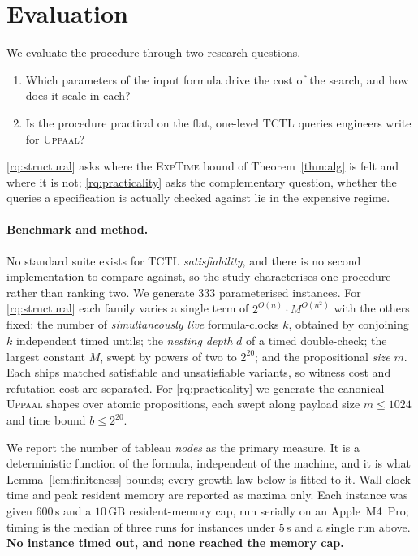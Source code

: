 \section{Evaluation}\label{sec:eval}

We evaluate the procedure through two research questions.

\begin{enumerate}[start=1,label={\bfseries RQ\arabic*:}, itemindent=2em, ref=\bfseries RQ\arabic*, itemsep=0.1em]
\item \label{rq:structural} Which parameters of the input formula drive the cost of the search, and
how does it scale in each?
\item \label{rq:practicality} Is the procedure practical on the flat, one-level TCTL queries
engineers write for \textsc{Uppaal}?
\end{enumerate}

\noindent
\ref{rq:structural} asks where the \textsc{ExpTime} bound of Theorem~\ref{thm:alg} is felt and where
it is not; \ref{rq:practicality} asks the complementary question, whether the queries a specification
is actually checked against lie in the expensive regime.

\paragraph{Benchmark and method.}
No standard suite exists for TCTL \emph{satisfiability}, and there is no second implementation to
compare against, so the study characterises one procedure rather than ranking two. We generate $333$
parameterised instances. For \ref{rq:structural} each family varies a single term of
$2^{O(n)}\cdot M^{O(n^{2})}$ with the others fixed: the number of \emph{simultaneously live}
formula-clocks $k$, obtained by conjoining $k$ independent timed untils; the \emph{nesting depth} $d$
of a timed double-check; the largest constant $M$, swept by powers of two to $2^{20}$; and the
propositional \emph{size} $m$. Each ships matched satisfiable and unsatisfiable variants, so witness
cost and refutation cost are separated. For \ref{rq:practicality} we generate the canonical
\textsc{Uppaal} shapes over atomic propositions, each swept along payload size $m\le1024$ and time
bound $b\le2^{20}$.

We report the number of tableau \emph{nodes} as the primary measure. It is a deterministic function
of the formula, independent of the machine, and it is what Lemma~\ref{lem:finiteness} bounds; every
growth law below is fitted to it. Wall-clock time and peak resident memory are reported as maxima
only. Each instance was given $600$\,s and a $10$\,GB resident-memory cap, run serially on an
Apple~M4~Pro; timing is the median of three runs for instances under $5$\,s and a single run above.
\textbf{No instance timed out, and none reached the memory cap.}

